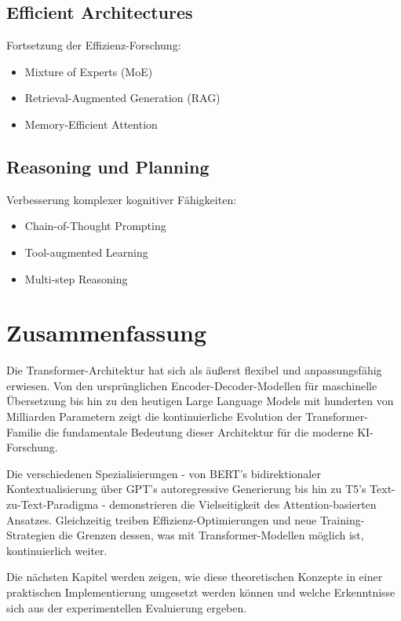 \subsection{Efficient Architectures}

Fortsetzung der Effizienz-Forschung:
\begin{itemize}
    \item Mixture of Experts (MoE)
    \item Retrieval-Augmented Generation (RAG)
    \item Memory-Efficient Attention
\end{itemize}

\subsection{Reasoning und Planning}

Verbesserung komplexer kognitiver Fähigkeiten:
\begin{itemize}
    \item Chain-of-Thought Prompting
    \item Tool-augmented Learning
    \item Multi-step Reasoning
\end{itemize}

\section{Zusammenfassung}

Die Transformer-Architektur hat sich als äußerst flexibel und anpassungsfähig erwiesen. Von den ursprünglichen Encoder-Decoder-Modellen für maschinelle Übersetzung bis hin zu den heutigen Large Language Models mit hunderten von Milliarden Parametern zeigt die kontinuierliche Evolution der Transformer-Familie die fundamentale Bedeutung dieser Architektur für die moderne KI-Forschung.

Die verschiedenen Spezialisierungen - von BERT's bidirektionaler Kontextualisierung über GPT's autoregressive Generierung bis hin zu T5's Text-zu-Text-Paradigma - demonstrieren die Vielseitigkeit des Attention-basierten Ansatzes. Gleichzeitig treiben Effizienz-Optimierungen und neue Training-Strategien die Grenzen dessen, was mit Transformer-Modellen möglich ist, kontinuierlich weiter.

Die nächsten Kapitel werden zeigen, wie diese theoretischen Konzepte in einer praktischen Implementierung umgesetzt werden können und welche Erkenntnisse sich aus der experimentellen Evaluierung ergeben.